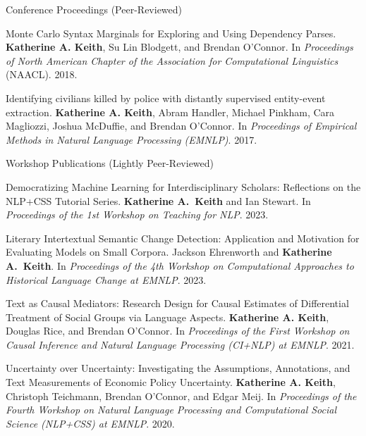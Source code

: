 \documentclass{resume} %
\begin{document}
\begin{rSection}{Conference Proceedings (Peer-Reviewed)}
\begin{etaremune}
\item Monte Carlo Syntax Marginals for Exploring and Using Dependency Parses.
\textbf{Katherine A. Keith}, Su Lin Blodgett, and Brendan O'Connor.
In \emph{Proceedings of North American Chapter of the Association for Computational Linguistics} (NAACL). 2018.

\item Identifying civilians killed by police with distantly supervised entity-event extraction. 
\textbf{Katherine A. Keith}, Abram Handler, Michael Pinkham, Cara Magliozzi, Joshua McDuffie, and Brendan O'Connor. In \emph{Proceedings of Empirical Methods in Natural Language Processing (EMNLP)}. 2017. 

\end{etaremune}
\end{rSection}

\begin{rSection}{Workshop Publications (Lightly Peer-Reviewed)}
\begin{etaremune}

\item Democratizing Machine Learning for Interdisciplinary Scholars:
Reflections on the NLP+CSS Tutorial Series. 
\textbf{Katherine A.~Keith} and Ian Stewart. 
In \emph{Proceedings of the 1st Workshop on Teaching for NLP}. 2023. 

\item Literary Intertextual Semantic Change Detection:
Application and Motivation for Evaluating Models on Small Corpora.
Jackson Ehrenworth and \textbf{Katherine A.~Keith}. 
In \emph{Proceedings of the 4th Workshop on Computational Approaches to Historical Language Change at EMNLP}. 2023. 


\item Text as Causal Mediators: Research Design for Causal Estimates of Differential Treatment of Social Groups via Language Aspects. \textbf{Katherine A. Keith}, Douglas Rice, and Brendan O'Connor. In \emph{Proceedings of the First Workshop on Causal Inference and Natural Language Processing (CI+NLP) at EMNLP}. 2021.  

\item Uncertainty over Uncertainty: Investigating the Assumptions, Annotations, and Text Measurements of Economic Policy Uncertainty. \textbf{Katherine A. Keith}, Christoph Teichmann, Brendan O’Connor, and Edgar Meij.  In \emph{Proceedings of the Fourth Workshop on Natural Language Processing and Computational Social Science (NLP+CSS) at EMNLP}. 2020.

\end{etaremune}
\end{rSection}
\end{document}
